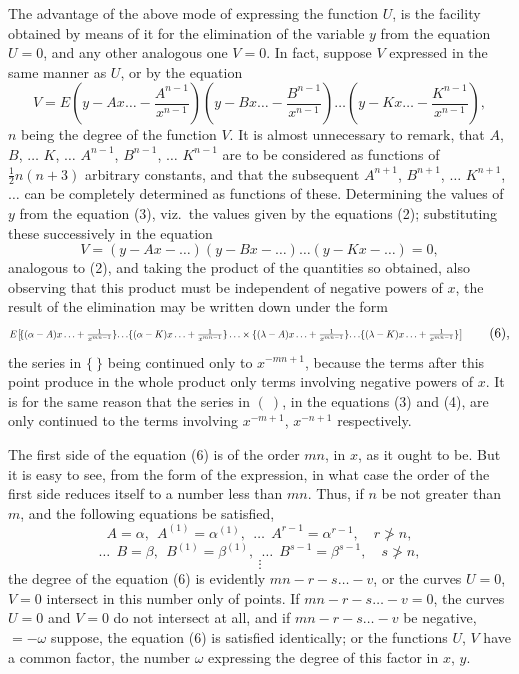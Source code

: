 \documentclass[11pt]{article}
\begin{document}
The advantage of the above mode of expressing the function $U$, is the facility obtained by means of it for the elimination of the variable $y$ from the equation $U = 0$, and any other analogous one $V = 0$. In fact, suppose $V$ expressed in the same manner as $U$, or by the equation
\[
V = E\!\left(y - A x \ldots - \frac{A^{n-1}}{x^{n-1}}\right)\!\left(y - B x \ldots - \frac{B^{n-1}}{x^{n-1}}\right) \ldots \left(y - K x \ldots - \frac{K^{n-1}}{x^{n-1}}\right) \tag{4},
\]
$n$ being the degree of the function $V$. It is almost unnecessary to remark, that $A$, $B$, $\ldots$ $K$, $\ldots$ $A^{n-1}$, $B^{n-1}$, $\ldots$ $K^{n-1}$ are to be considered as functions of $\tfrac12 n(n + 3)$ arbitrary constants, and that the subsequent $A^{n+1}$, $B^{n+1}$, $\ldots$ $K^{n+1}$, $\ldots$ can be completely determined as functions of these. Determining the values of $y$ from the equation (3), viz.\ the values given by the equations (2); substituting these successively in the equation
\[
V = (y - A x - \ldots)(y - B x - \ldots) \ldots (y - K x - \ldots) = 0 \tag{5},
\]
analogous to (2), and taking the product of the quantities so obtained, also observing that this product must be independent of negative powers of $x$, the result of the elimination may be written down under the form
\[
\resizebox{\textwidth}{!}{$\displaystyle
E\!\left[\!\{(\alpha - A) x \ldots + \tfrac{1}{x^{mn-1}}\}\!\ldots\!\{(\alpha - K) x \ldots + \tfrac{1}{x^{mn-1}}\} \ldots \times \{(\lambda - A) x \ldots + \tfrac{1}{x^{mn-1}}\}\!\ldots\!\{(\lambda - K) x \ldots + \tfrac{1}{x^{mn-1}}\}\right]
$} \tag{6},
\]
the series in $\{\ \}$ being continued only to $x^{-mn+1}$, because the terms after this point produce in the whole product only terms involving negative powers of $x$. It is for the same reason that the series in $(\ )$, in the equations (3) and (4), are only continued to the terms involving $x^{-m+1}$, $x^{-n+1}$ respectively.

The first side of the equation (6) is of the order $mn$, in $x$, as it ought to be. But it is easy to see, from the form of the expression, in what case the order of the first side reduces itself to a number less than $mn$. Thus, if $n$ be not greater than $m$, and the following equations be satisfied,
\[
A = \alpha,\ \ A^{(1)} = \alpha^{(1)},\ \ \ldots\ \ A^{r-1} = \alpha^{r-1},\quad r \not> n \tag{7},
\]
\[
\ldots\ \ B = \beta,\ \ B^{(1)} = \beta^{(1)},\ \ \ldots\ \ B^{s-1} = \beta^{s-1},\quad s \not> n,
\]
\[
\vdots
\]
the degree of the equation (6) is evidently $mn - r - s \ldots - v$, or the curves $U = 0$, $V = 0$ intersect in this number only of points. If $mn - r - s \ldots - v = 0$, the curves $U = 0$ and $V = 0$ do not intersect at all, and if $mn - r - s \ldots - v$ be negative, $= -\omega$ suppose, the equation (6) is satisfied identically; or the functions $U$, $V$ have a common factor, the number $\omega$ expressing the degree of this factor in $x$, $y$.
\end{document}
